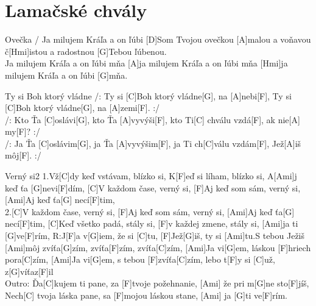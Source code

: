 \documentclass[12pt]{article}
\begin{document}
\newpage

\section{Lamačské chvály}

\begin{songgroup}{2}
	\begin{groupitem}{Ovečka / Ja milujem Kráľa a on ľúbi}
		[D]Som Tvojou ovečkou	
		[A]malou a voňavou	
		č[Hmi]istou a radostnou 
		[G]Tebou ľúbenou.
		\\
		[D]Ja milujem Kráľa a on ľúbi mňa
		[A]ja milujem Kráľa a on ľúbi mňa
		[Hmi]ja milujem Kráľa a on ľúbi [G]mňa.
	\end{groupitem}
	\columnbreak
	\begin{groupitem}{Ty si Boh ktorý vládne}
		/: Ty si [C]Boh ktorý vládne[G], na [A]nebi[F],  
		Ty si [C]Boh ktorý vládne[G], na [A]zemi[F]. :/ 
		\\
		/: Kto Ťa [C]oslávi[G], kto Ťa [A]vyvýši[F], 
		kto Ti[C] chválu vzdá[F], ak nie[A] my[F]? :/
		\\
		/: Ja Ťa [C]oslávim[G], ja Ťa [A]vyvýšim[F],
		ja Ti ch[C]válu vzdám[F], Jež[A]iš môj[F]. :/
	\end{groupitem}
\end{songgroup}

\begin{song}{Verný si}{2}
	1.Vž[C]dy keď vstávam, blízko si,
	K[F]eď si líham, blízko si,
	A[Ami]j keď ťa [G]nevi[F]dím,
	[C]V každom čase, verný si,
	[F]Aj keď som sám, verný si,
	[Ami]Aj keď ťa[G] necí[F]tim,
	\\
	2.[C]V každom čase, verný si,
	[F]Aj keď som sám, verný si,
	[Ami]Aj keď ťa[G] necí[F]tim,
	[C]Keď všetko padá, stály si,
	[F]v každej zmene, stály si,
	[Ami]ja ti [G]ve[F]rím,
	\columnbreak
	R:J[F]a v[G]iem, že si [C]tu,
	[F]Jež[G]iš, ty si [Ami]tu.S tebou Ježiš [Ami]môj
	zvíťa[G]zím, zvíťa[F]zím, zvíťa[C]zím,
	[Ami]Ja vi[G]em, láskou [F]hriech pora[C]zím,
	[Ami]Ja vi[G]em, s tebou [F]zvíťa[C]zím,
	lebo t[F]y si [C]už, z[G]víťaz[F]il
	\\
	Outro:
	Ďa[C]kujem ti pane, 
	za [F]tvoje požehnanie, 
	[Ami] že pri m[G]ne sto[F]jíš,
	Nech[C] tvoja láska pane, 
	sa [F]mojou láskou stane,
	[Ami] ja [G]ti ve[F]rím.
\end{song}
\end{document}
